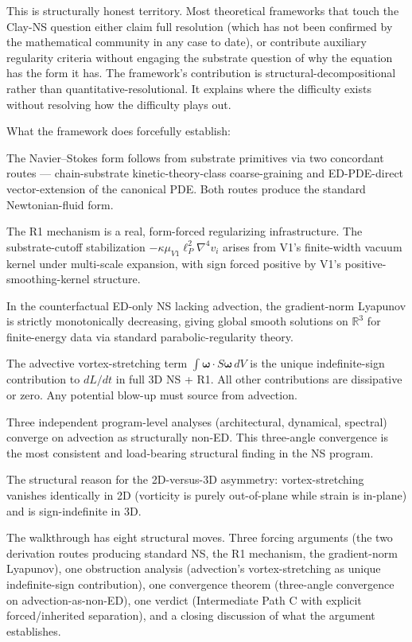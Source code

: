 \documentclass[11pt,a4paper]{article}
\begin{document}
This is structurally honest territory. Most theoretical frameworks that touch the Clay-NS question either claim full resolution (which has not been confirmed by the mathematical community in any case to date), or contribute auxiliary regularity criteria without engaging the substrate question of why the equation has the form it has. The framework's contribution is structural-decompositional rather than quantitative-resolutional. It explains where the difficulty exists without resolving how the difficulty plays out.

What the framework does forcefully establish:

The Navier--Stokes form follows from substrate primitives via two concordant routes --- chain-substrate kinetic-theory-class coarse-graining and ED-PDE-direct vector-extension of the canonical PDE. Both routes produce the standard Newtonian-fluid form.

The R1 mechanism is a real, form-forced regularizing infrastructure. The substrate-cutoff stabilization $-\kappa\mu_{V1}\ell_P^2\nabla^4 v_i$ arises from V1's finite-width vacuum kernel under multi-scale expansion, with sign forced positive by V1's positive-smoothing-kernel structure.

In the counterfactual ED-only NS lacking advection, the gradient-norm Lyapunov is strictly monotonically decreasing, giving global smooth solutions on $\mathbb{R}^3$ for finite-energy data via standard parabolic-regularity theory.

The advective vortex-stretching term $\int\boldsymbol{\omega}\cdot S\boldsymbol{\omega}\, dV$ is the unique indefinite-sign contribution to $dL/dt$ in full 3D NS + R1. All other contributions are dissipative or zero. Any potential blow-up must source from advection.

Three independent program-level analyses (architectural, dynamical, spectral) converge on advection as structurally non-ED. This three-angle convergence is the most consistent and load-bearing structural finding in the NS program.

The structural reason for the 2D-versus-3D asymmetry: vortex-stretching vanishes identically in 2D (vorticity is purely out-of-plane while strain is in-plane) and is sign-indefinite in 3D.

The walkthrough has eight structural moves. Three forcing arguments (the two derivation routes producing standard NS, the R1 mechanism, the gradient-norm Lyapunov), one obstruction analysis (advection's vortex-stretching as unique indefinite-sign contribution), one convergence theorem (three-angle convergence on advection-as-non-ED), one verdict (Intermediate Path C with explicit forced/inherited separation), and a closing discussion of what the argument establishes.
\end{document}
